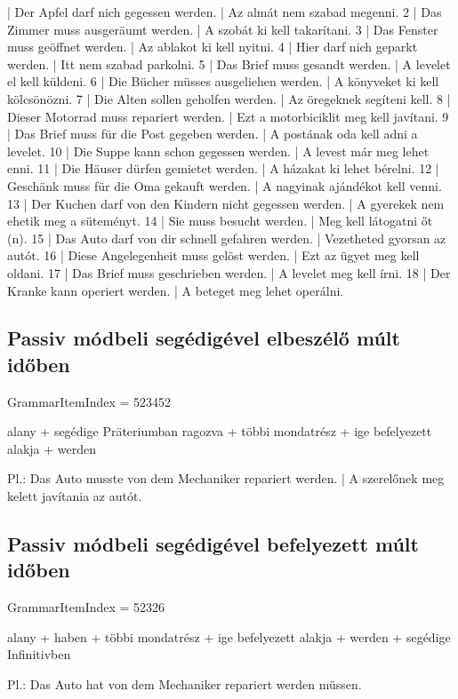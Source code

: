 \documentclass{article}
\newenvironment{desc}{\verbatim}{\endverbatim}
\newenvironment{exmp}{\verbatim}{\endverbatim}
\begin{document}
\begin{exmp}
1 | Der Apfel darf nich gegessen werden. | Az almát nem szabad megenni.
2 | Das Zimmer muss ausgeräumt werden. | A szobát ki kell takarítani.
3 | Das Fenster muss geöffnet werden. | Az ablakot ki kell nyitni.
4 | Hier darf nich geparkt werden. | Itt nem szabad parkolni.
5 | Das Brief muss gesandt werden. | A levelet el kell küldeni.
6 | Die Bücher müsses ausgeliehen werden. | A könyveket ki kell kölcsönözni.
7 | Die Alten sollen geholfen werden. | Az öregeknek segíteni kell.
8 | Dieser Motorrad muss repariert werden. | Ezt a motorbiciklit meg kell javítani.
9 | Das Brief muss für die Post gegeben werden. | A postának oda kell adni a levelet.
10 | Die Suppe kann schon gegessen werden. | A levest már meg lehet enni.
11 | Die Häuser dürfen gemietet werden. | A házakat ki lehet bérelni.
12 | Geschänk muss für die Oma gekauft werden. | A nagyinak ajándékot kell venni.
13 | Der Kuchen darf von den Kindern nicht gegessen werden. | A gyerekek nem ehetik meg a süteményt.
14 | Sie muss besucht werden. | Meg kell látogatni őt (n).
15 | Das Auto darf von dir schnell gefahren werden. | Vezetheted gyorsan az autót.
16 | Diese Angelegenheit muss gelöst werden. | Ezt az ügyet meg kell oldani.
17 | Das Brief muss geschrieben werden. | A levelet meg kell írni.
18 | Der Kranke kann operiert werden. | A beteget meg lehet operálni.
\end{exmp}

\subsection{Passiv módbeli segédigével elbeszélő múlt időben}

GrammarItemIndex = 523452

\begin{desc}
alany + segédige Präteriumban ragozva + többi mondatrész + ige befelyezett alakja + werden

Pl.: Das Auto musste von dem Mechaniker repariert werden. | A szerelőnek meg kelett javítania az autót.
\end{desc}

\subsection{Passiv módbeli segédigével befelyezett múlt időben}

GrammarItemIndex = 52326

\begin{desc}
alany + haben + többi mondatrész + ige befelyezett alakja + werden + segédige Infinitivben

Pl.: Das Auto hat von dem Mechaniker repariert werden müssen.
\end{desc}
\end{document}
